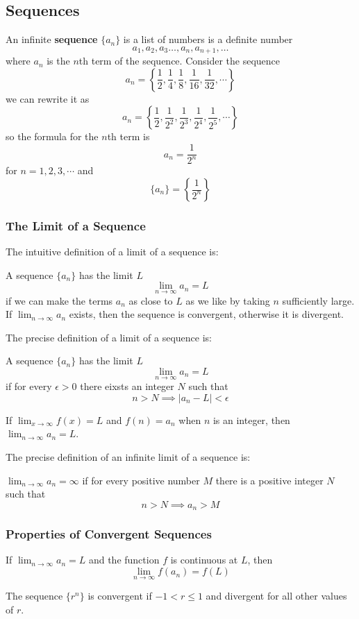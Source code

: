 \subsection{Sequences}
An infinite \textbf{sequence} \(\{a_n\}\) is a list of numbers is a definite
number
\[a_1,a_2,a_3\dots,a_n,a_{n+1},\dots\]
where \(a_n\) is the \(n\)th term of the sequence.
Consider the sequence
\[a_n=\left\{\frac{1}{2},\frac{1}{4},\frac{1}{8},\frac{1}{16},\frac{1}{32},
\cdots\right\}\]
we can rewrite it as
\[a_n=\left\{\frac{1}{2},\frac{1}{2^2},\frac{1}{2^3},\frac{1}{2^4},
\frac{1}{2^5},\cdots\right\}\]
so the formula for the \(n\)th term is
\[a_n=\frac{1}{2^n}\]
for \(n=1,2,3,\cdots\) and
\[\{a_n\}=\left\{\frac{1}{2^n}\right\}\]

\subsubsection*{The Limit of a Sequence}
The intuitive definition of a limit of a sequence is:
\begin{definition}
    A sequence \(\{a_n\}\) has the limit \(L\)
    \[\lim_{n\to\infty}a_n=L\]
    if we can make the terms \(a_n\) as close to \(L\) as we like by taking
    \(n\) sufficiently large.
    If \(\lim_{n\to\infty}a_n\) exists, then the sequence is convergent,
    otherwise it is divergent.
\end{definition}
The precise definition of a limit of a sequence is:
\begin{definition}
    A sequence \(\{a_n\}\) has the limit \(L\)
    \[\lim_{n\to\infty}a_n=L\]
    if for every \(\epsilon>0\) there eixsts an integer \(N\) such that
    \[n>N\implies |a_n-L|<\epsilon\]
\end{definition}
\begin{theorem}
    If \(\lim_{x\to\infty}f(x)=L\) and \(f(n)=a_n\) when \(n\) is an integer,
    then \(\lim_{n\to\infty}a_n=L\).
\end{theorem}
The precise definition of an infinite limit of a sequence is:
\begin{definition}
    \(\lim_{n\to\infty}a_n=\infty\) if for every positive number \(M\) there
    is a positive integer \(N\) such that
    \[n>N\implies a_n>M\]
\end{definition}

\subsubsection*{Properties of Convergent Sequences}
\begin{theorem}
    If \(\lim_{n\to\infty}a_n=L\) and the function \(f\) is continuous at
    \(L\), then
    \[\lim_{n\to\infty}f(a_n)=f(L)\]
\end{theorem}
The sequence \(\{r^n\}\) is convergent if \(-1<r\leq 1\) and divergent for all
other values of \(r\).

